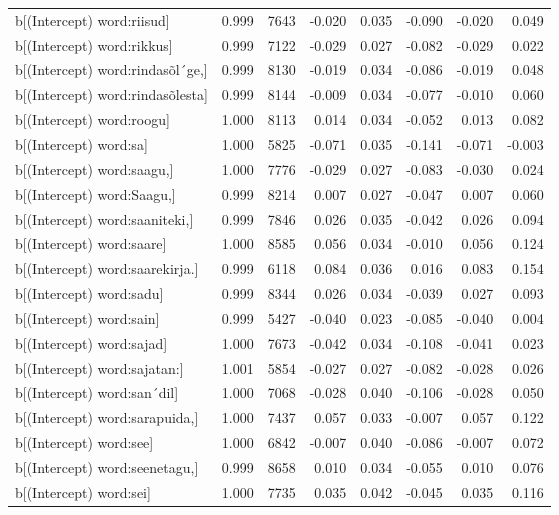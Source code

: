 \begin{longtable}{lrrrrrrr}
  b[(Intercept) word:riisud] & 0.999 & 7643 & -0.020 & 0.035 & -0.090 & -0.020 & 0.049 \\ 
  b[(Intercept) word:rikkus] & 0.999 & 7122 & -0.029 & 0.027 & -0.082 & -0.029 & 0.022 \\ 
  b[(Intercept) word:rindasõl´ge,] & 0.999 & 8130 & -0.019 & 0.034 & -0.086 & -0.019 & 0.048 \\ 
  b[(Intercept) word:rindasõlesta] & 0.999 & 8144 & -0.009 & 0.034 & -0.077 & -0.010 & 0.060 \\ 
  b[(Intercept) word:roogu] & 1.000 & 8113 & 0.014 & 0.034 & -0.052 & 0.013 & 0.082 \\ 
  b[(Intercept) word:sa] & 1.000 & 5825 & -0.071 & 0.035 & -0.141 & -0.071 & -0.003 \\ 
  b[(Intercept) word:saagu,] & 1.000 & 7776 & -0.029 & 0.027 & -0.083 & -0.030 & 0.024 \\ 
  b[(Intercept) word:Saagu,] & 0.999 & 8214 & 0.007 & 0.027 & -0.047 & 0.007 & 0.060 \\ 
  b[(Intercept) word:saaniteki,] & 0.999 & 7846 & 0.026 & 0.035 & -0.042 & 0.026 & 0.094 \\ 
  b[(Intercept) word:saare] & 1.000 & 8585 & 0.056 & 0.034 & -0.010 & 0.056 & 0.124 \\ 
  b[(Intercept) word:saarekirja.] & 0.999 & 6118 & 0.084 & 0.036 & 0.016 & 0.083 & 0.154 \\ 
  b[(Intercept) word:sadu] & 0.999 & 8344 & 0.026 & 0.034 & -0.039 & 0.027 & 0.093 \\ 
  b[(Intercept) word:sain] & 0.999 & 5427 & -0.040 & 0.023 & -0.085 & -0.040 & 0.004 \\ 
  b[(Intercept) word:sajad] & 1.000 & 7673 & -0.042 & 0.034 & -0.108 & -0.041 & 0.023 \\ 
  b[(Intercept) word:sajatan:] & 1.001 & 5854 & -0.027 & 0.027 & -0.082 & -0.028 & 0.026 \\ 
  b[(Intercept) word:san´dil] & 1.000 & 7068 & -0.028 & 0.040 & -0.106 & -0.028 & 0.050 \\ 
  b[(Intercept) word:sarapuida,] & 1.000 & 7437 & 0.057 & 0.033 & -0.007 & 0.057 & 0.122 \\ 
  b[(Intercept) word:see] & 1.000 & 6842 & -0.007 & 0.040 & -0.086 & -0.007 & 0.072 \\ 
  b[(Intercept) word:seenetagu,] & 0.999 & 8658 & 0.010 & 0.034 & -0.055 & 0.010 & 0.076 \\ 
  b[(Intercept) word:sei] & 1.000 & 7735 & 0.035 & 0.042 & -0.045 & 0.035 & 0.116 \\ 

\end{longtable}
